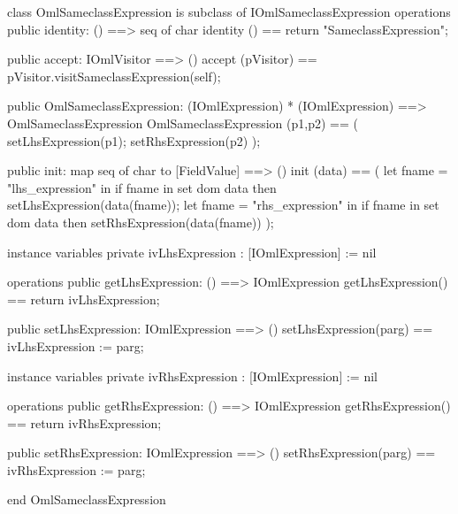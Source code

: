 \begin{vdm_al}
class OmlSameclassExpression is subclass of IOmlSameclassExpression
operations
  public identity: () ==> seq of char
  identity () == return "SameclassExpression";

  public accept: IOmlVisitor ==> ()
  accept (pVisitor) == pVisitor.visitSameclassExpression(self);

  public OmlSameclassExpression:
      (IOmlExpression) *
      (IOmlExpression) ==> OmlSameclassExpression
  OmlSameclassExpression (p1,p2) == 
   ( setLhsExpression(p1);
     setRhsExpression(p2) );

  public init: map seq of char to [FieldValue] ==> ()
  init (data) ==
    ( let fname = "lhs_expression" in
        if fname in set dom data
        then setLhsExpression(data(fname));
      let fname = "rhs_expression" in
        if fname in set dom data
        then setRhsExpression(data(fname)) );

instance variables
  private ivLhsExpression : [IOmlExpression] := nil

operations
  public getLhsExpression: () ==> IOmlExpression
  getLhsExpression() == return ivLhsExpression;

  public setLhsExpression: IOmlExpression ==> ()
  setLhsExpression(parg) == ivLhsExpression := parg;

instance variables
  private ivRhsExpression : [IOmlExpression] := nil

operations
  public getRhsExpression: () ==> IOmlExpression
  getRhsExpression() == return ivRhsExpression;

  public setRhsExpression: IOmlExpression ==> ()
  setRhsExpression(parg) == ivRhsExpression := parg;

end OmlSameclassExpression
\end{vdm_al}

